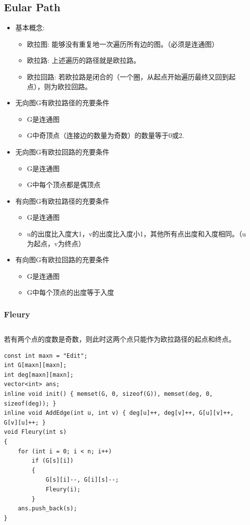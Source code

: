 \documentclass[twoside]{article}
\begin{document}
\subsection{Eular Path}
\begin{itemize}
\item  基本概念:
    \begin{itemize}
    \item 欧拉图: 能够没有重复地一次遍历所有边的图。（必须是连通图）
    \item 欧拉路: 上述遍历的路径就是欧拉路。
    \item 欧拉回路: 若欧拉路是闭合的（一个圈，从起点开始遍历最终又回到起点），则为欧拉回路。
    \end{itemize}
\item 无向图G有欧拉路径的充要条件
    \begin{itemize}
    \item G是连通图
    \item G中奇顶点（连接边的数量为奇数）的数量等于0或2.
    \end{itemize}
\item 无向图G有欧拉回路的充要条件
    \begin{itemize}
    \item G是连通图
    \item G中每个顶点都是偶顶点
    \end{itemize}
\item 有向图G有欧拉路径的充要条件
    \begin{itemize}
    \item G是连通图
    \item u的出度比入度大1，v的出度比入度小1，其他所有点出度和入度相同。（u为起点，v为终点）
    \end{itemize}
\item 有向图G有欧拉回路的充要条件
    \begin{itemize}
    \item G是连通图
    \item G中每个顶点的出度等于入度
    \end{itemize}
\end{itemize}
\subsubsection{Fleury}
\begin{lstlisting}
\end{lstlisting}
若有两个点的度数是奇数，则此时这两个点只能作为欧拉路径的起点和终点。
\begin{lstlisting}
const int maxn = "Edit";
int G[maxn][maxn];
int deg[maxn][maxn];
vector<int> ans;
inline void init() { memset(G, 0, sizeof(G)), memset(deg, 0, sizeof(deg)); }
inline void AddEdge(int u, int v) { deg[u]++, deg[v]++, G[u][v]++, G[v][u]++; }
void Fleury(int s)
{
    for (int i = 0; i < n; i++)
        if (G[s][i])
        {
            G[s][i]--, G[i][s]--;
            Fleury(i);
        }
    ans.push_back(s);
}
\end{lstlisting}
\end{document}
